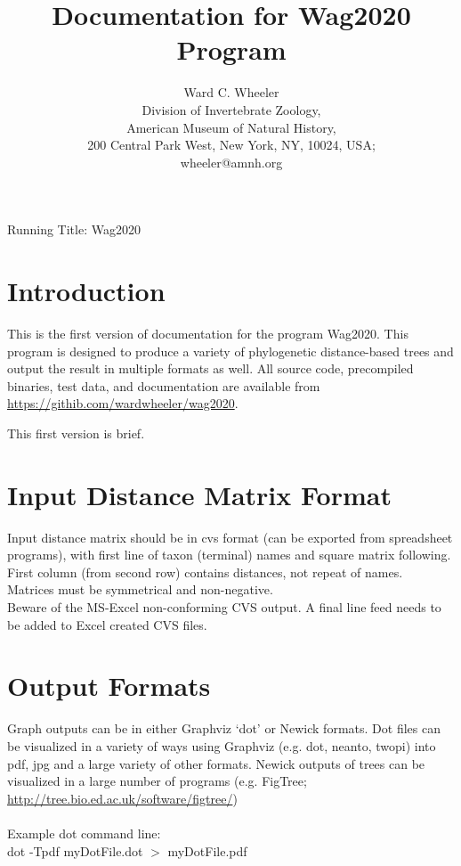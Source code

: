 \documentclass[11pt]{memoir}
\begin{document}
	
	\title{Documentation for Wag2020 Program}
	\author{Ward C. Wheeler\\
		Division of Invertebrate Zoology,\\ American Museum of Natural History,\\ 200 Central Park West, New York, NY, 10024, USA;\\wheeler@amnh.org}
	
	
	\maketitle
	\begin{center}
		Running Title: Wag2020
	\end{center}
	\newpage
	
	
	\section{Introduction}
	This is the first version of documentation for the program Wag2020.  This program is designed to produce a variety of 
	phylogenetic distance-based  trees and output the result in multiple formats as well.
	All source code, precompiled binaries, test data, and documentation are available from \url{https://githib.com/wardwheeler/wag2020}.
	
	This first version is brief.
	
	\section{Input Distance Matrix Format}
	Input distance matrix should be in cvs format (can be exported from spreadsheet programs),  with first line of
	taxon (terminal) names and square matrix following.  First column (from second row) contains distances, not repeat of names.\\
	
	\noindent Matrices must be symmetrical and non-negative.\\
	
	\noindent Beware of the MS-Excel
	non-conforming CVS output.  A final line feed needs to be added to Excel created CVS files.
	
	\section{Output Formats}
	Graph outputs can be in either Graphviz `dot' or Newick formats.  Dot files can be visualized in a variety of ways 
	using Graphviz (e.g. dot, neanto, twopi) into pdf, jpg and a large variety of other formats. Newick outputs of trees 
	can be visualized in a 
	large number of programs (e.g. FigTree; \url{http://tree.bio.ed.ac.uk/software/figtree/})\\ 
	\\
	Example dot command line: \\
		dot -Tpdf myDotFile.dot $>$ myDotFile.pdf\\
	
\end{document}
